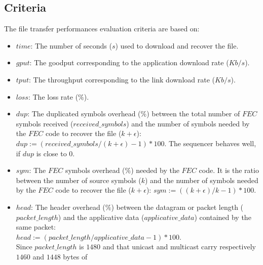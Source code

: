 \documentclass[a4paper]{article}
\begin{document}
     \subsection{Criteria}
        The file transfer performances evaluation criteria are based on:
\begin{itemize}
            \item{
                $time$: The number of seconds ($s$) used to download and recover
                    the file.
            }
            \item{
                $gput$: The goodput corresponding to the application download
                    rate ($Kb/s$).
            }
            \item{
                $tput$: The throughput corresponding to the link download rate
                    ($Kb/s$).
            }
            \item{
                $loss$: The loss rate ($\%$).
            }
            \item{
                $dup$: The duplicated symbols overhead ($\%$) between the total
                    number of $FEC$ symbols received ($received\_symbols$) and
                    the number of symbols needed by the $FEC$ code to recover
                    the file ($k + \epsilon$): $dup := (received\_symbols / (k +
                                \epsilon) - 1) * 100$.  The sequencer behaves
                                                well, if $dup$ is close to $0$.
            }
            \item{
                $sym$: The $FEC$ symbols overhead ($\%$) needed by the $FEC$
                    code. It is the ratio between the number of source
                    symbols ($k$) and the number of symbols needed
                    by the $FEC$ code to recover the file ($k + \epsilon$):
                        $sym := ((k + \epsilon) / k - 1) * 100$.
            }
            \item{
                $head$: The header overhead ($\%$) between
                    the datagram or packet length ($packet\_length$) and the
                    applicative data ($applicative\_data$) contained by the same
                    packet:
                    \\
                    $head := (packet\_length / applicative\_data - 1) * 100$.
                    \\
                    Since $packet\_length$ is $1480$ and that unicast
                    and multicast carry respectively $1460$ and $1448$ bytes of
}
\end{itemize}
\end{document}
